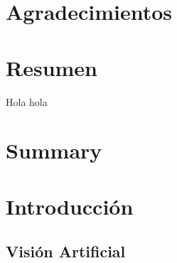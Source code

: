 \documentclass[a4paper, 12pt]{book}
\begin{document}
\chapter*{Agradecimientos}



\chapter*{Resumen}
Hola hola


\chapter*{Summary}




\tableofcontents 
\cleardoublepage
\listoffigures %



\cleardoublepage
\chapter{Introducción}
\label{sec:intro} %


\section{Visión Artificial}
\label{sec:visionartificial}
\end{document}
